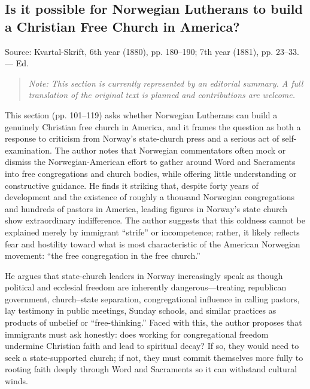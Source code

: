 
\subsection{Is it possible for Norwegian Lutherans to build a Christian Free Church in America?}

Source: Kvartal-Skrift, 6th year (1880), pp. 180–190; 7th year (1881), pp. 23–33. — Ed.

\begin{quote}
\emph{Note: This section is currently represented by an editorial summary. 
A full translation of the original text is planned and contributions are welcome.}
\end{quote}


This section (pp. 101–119) asks whether Norwegian Lutherans can build a genuinely Christian free church in America, and it frames the question as both a response to criticism from Norway’s state-church press and a serious act of self-examination. The author notes that Norwegian commentators often mock or dismiss the Norwegian-American effort to gather around Word and Sacraments into free congregations and church bodies, while offering little understanding or constructive guidance. He finds it striking that, despite forty years of development and the existence of roughly a thousand Norwegian congregations and hundreds of pastors in America, leading figures in Norway’s state church show extraordinary indifference. The author suggests that this coldness cannot be explained merely by immigrant “strife” or incompetence; rather, it likely reflects fear and hostility toward what is most characteristic of the American Norwegian movement: “the free congregation in the free church.”

He argues that state-church leaders in Norway increasingly speak as though political and ecclesial freedom are inherently dangerous—treating republican government, church–state separation, congregational influence in calling pastors, lay testimony in public meetings, Sunday schools, and similar practices as products of unbelief or “free-thinking.” Faced with this, the author proposes that immigrants must ask honestly: does working for congregational freedom undermine Christian faith and lead to spiritual decay? If so, they would need to seek a state-supported church; if not, they must commit themselves more fully to rooting faith deeply through Word and Sacraments so it can withstand cultural winds.

